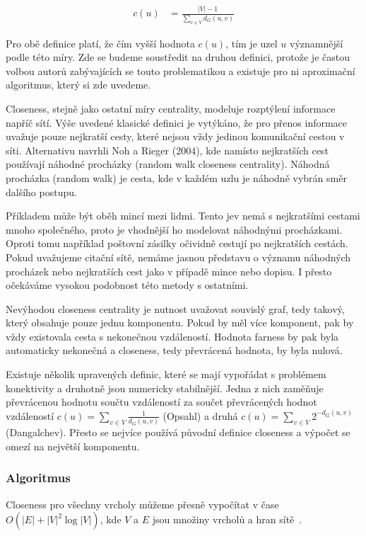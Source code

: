\documentclass{bakalarka}
\begin{document}
\begin{align*}
c(u) &= \frac{|V| - 1}{\sum_{v \in V} d_G(u, v)}
\end{align*}

Pro obě definice platí, že čím vyšší hodnota $c(u)$, tím je uzel $u$
významnější podle této míry. Zde se budeme soustředit na druhou definici,
protože je častou volbou autorů zabývajících se touto problematikou a existuje
pro ni aproximační algoritmus, který si zde uvedeme.

Closeness, stejně jako ostatní míry centrality, modeluje rozptýlení informace
napříč sítí. Výše uvedené klasické definici je vytýkáno, že pro přenos
informace uvažuje pouze nejkratší cesty, které nejsou vždy jedinou komunikační
cestou v síti. Alternativu navrhli Noh a Rieger (2004), kde namísto nejkratších
cest používají náhodné procházky (random walk closeness centrality). Náhodná
procházka (random walk) je cesta, kde v každém uzlu je náhodně vybrán směr
dalšího postupu.

Příkladem může být oběh mincí mezi lidmi. Tento jev nemá s nejkratšími cestami
mnoho společného, proto je vhodnější ho modelovat náhodnými procházkami. Oproti
tomu například poštovní zásilky očividně cestují po nejkratších cestách. Pokud
uvažujeme citační sítě, nemáme jasnou představu o významu náhodných procházek
nebo nejkratších cest jako v případě mince nebo dopisu. I přesto očekáváme
vysokou podobnost této metody s ostatními.

Nevýhodou closeness centrality je nutnost uvažovat souvislý graf, tedy takový,
který obsahuje pouze jednu komponentu. Pokud by měl více komponent, pak by vždy
existovala cesta s nekonečnou vzdáleností. Hodnota farness by pak byla
automaticky nekonečná a closeness, tedy převrácená hodnota, by byla nulová. 

Existuje několik upravených definic, které se mají vypořádat s problémem
konektivity a druhotně jsou numericky stabilnější. Jedna z nich zaměňuje
převrácenou hodnotu součtu vzdáleností za součet převrácených hodnot
vzdáleností $c(u) = \sum_{v \in V} \frac{1}{d_G(u, v)}$ (Opsahl) a druhá $c(u)
= \sum_{v \in V} 2^{-d_G(u, v)}$ (Dangalchev). Přesto se nejvíce používá
původní definice closeness a výpočet se omezí na největší komponentu.


\subsubsection{Algoritmus}
Closeness pro všechny vrcholy můžeme přesně vypočítat v čase $O(|E| +
|V|^2\log|V|)$, kde $V$ a $E$ jsou množiny vrcholů a hran
sítě~\cite{fredmantarjan1984}.
\end{document}
